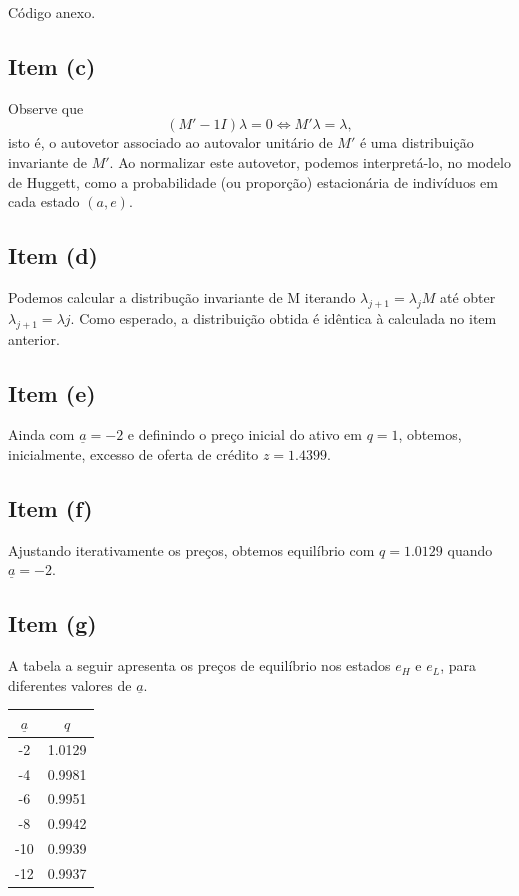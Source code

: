 \documentclass{article}
\begin{document}
Código anexo.

\subsection*{Item (c)}

Observe que $$(M' - 1I) \lambda = 0 \iff M' \lambda = \lambda,$$ isto é, 
o autovetor associado ao autovalor unitário de $M'$ é uma 
distribuição invariante de $M'$. Ao normalizar este autovetor,
podemos interpretá-lo, no modelo de Huggett, como a probabilidade (ou proporção) 
estacionária de indivíduos em cada estado $(a, e)$.

\subsection*{Item (d)}

Podemos calcular a distribução invariante de M iterando $\lambda_{j+1} = \lambda_j M$ até
obter $\lambda_{j+1} = \lambda{j}$. Como esperado, a distribuição obtida é idêntica à
calculada no item anterior.

\subsection*{Item (e)}

Ainda com $\underline{a} = -2$ e definindo o preço inicial do ativo 
em $q = 1$, obtemos, inicialmente, excesso de oferta de 
crédito $z =1.4399$.

\subsection*{Item (f)}

Ajustando iterativamente os preços, obtemos equilíbrio com $q = 1.0129$ quando $\underline{a} = -2$.

\subsection*{Item (g)}

A tabela a seguir apresenta os preços de equilíbrio nos estados $e_H$ e $e_L$,
para diferentes valores de $\underline{a}$. \\

\begin{center}
\begin{tabular}{cc}
	\hline $\underline{a}$ & $q$ \\ \hline
	-2  &  1.0129 \\
	-4  &  0.9981 \\
	-6  &  0.9951 \\
	-8  &  0.9942 \\
         -10  & 0.9939 \\
         -12  &  0.9937 \\ \hline
\end{tabular}
\end{center}
\end{document}
